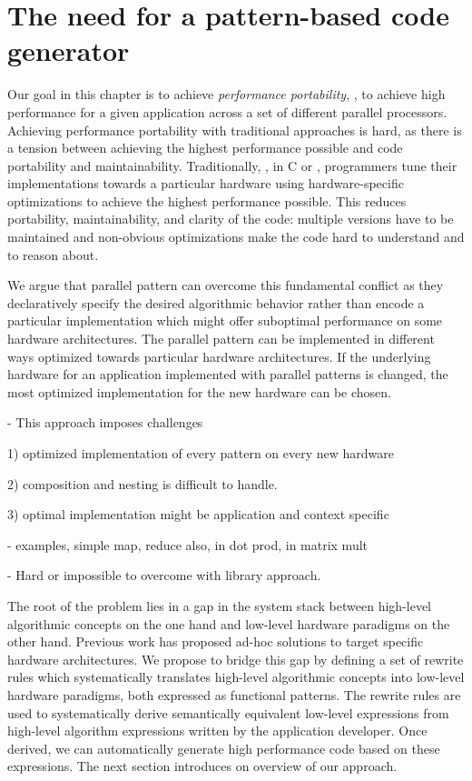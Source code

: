 \section{The need for a pattern-based code generator}

Our goal in this chapter is to achieve \emph{performance portability}, \ie, to achieve high performance for a given application across a set of different parallel processors.
Achieving performance portability with traditional approaches is hard, as there is a tension between achieving the highest performance possible and code portability and maintainability.
Traditionally, \eg, in C or \OpenCL, programmers tune their implementations towards a particular hardware using hardware-specific optimizations to achieve the highest performance possible.
This reduces portability, maintainability, and clarity of the code:
multiple versions have to be maintained and non-obvious optimizations make the code hard to understand and to reason about.

We argue that parallel pattern can overcome this fundamental conflict as they declaratively specify the desired algorithmic behavior rather than encode a particular implementation which might offer suboptimal performance on some hardware architectures.
The parallel pattern can be implemented in different ways optimized towards particular hardware architectures.
If the underlying hardware for an application implemented with parallel patterns is changed, the most optimized implementation for the new hardware can be chosen.

- This approach imposes challenges

1) optimized implementation of every pattern on every new hardware

2) composition and nesting is difficult to handle.

3) optimal implementation might be application and context specific

- examples, simple map, reduce also, in dot prod, in matrix mult

- Hard or impossible to overcome with library approach.

The root of the problem lies in a gap in the system stack between high-level algorithmic concepts on the one hand and low-level hardware paradigms on the other hand.
Previous work has proposed ad-hoc solutions to target specific hardware architectures.
We propose to bridge this gap by defining a set of rewrite rules which systematically translates high-level algorithmic concepts into low-level hardware paradigms, both expressed as functional patterns.
The rewrite rules are used to systematically derive semantically equivalent low-level expressions from high-level algorithm expressions written by the application developer.
Once derived, we can automatically generate high performance code based on these expressions.
The next section introduces on overview of our approach.
 
